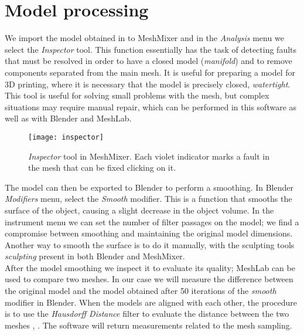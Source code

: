 \newpage

\section{Model processing}
We import the model obtained in to MeshMixer and in the \emph{Analysis} menu we select the \emph{Inspector} tool. This function essentially has the task of detecting faults that must be resolved in order to have a closed model (\emph{manifold}) and to remove components separated from the main mesh. It is useful for preparing a model for 3D printing, where it is necessary that the model is precisely closed,  \emph{watertight}. This tool is useful for solving small problems with the mesh, but complex situations may require manual repair, which can be performed in this software as well as with Blender and MeshLab.

\begin{figure}[h]
\centering
\texttt{[image: inspector]}
\caption{\emph{Inspector} tool in MeshMixer. Each violet indicator marks a fault in the mesh that can be fixed clicking on it.}
\label{fig:inspector}
\end{figure}

The model can then be exported to Blender to perform a smoothing. In Blender \emph{Modifiers} menu, select the \emph{Smooth} modifier. This is a function that smooths the surface of the object, causing a slight decrease in the object volume. In the instrument menu we can set the number of filter passages on the model; we find a compromise between smoothing and maintaining the original model dimensions. Another way to smooth the surface is to do it manually, with the sculpting tools \emph{sculpting} present in both Blender and MeshMixer. \\
After the model smoothing we inspect it to evaluate its quality; MeshLab can be used to compare two meshes. In our case we will measure the difference between the original model and the model obtained after 50 iterations of the \emph{smooth} modifier in Blender. When the models are aligned with each other, the procedure is to use the \emph{Hausdorff Distance} filter to evaluate the distance between the two meshes \parencite{Reference90}, \parencite{Reference91}. The software will return measurements related to the mesh sampling. \\

